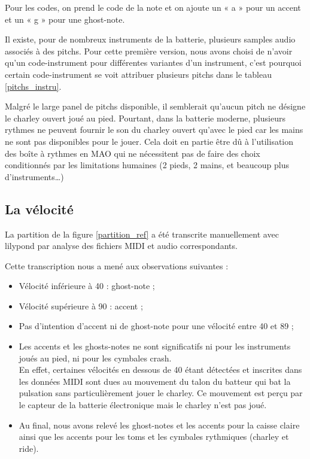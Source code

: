 Pour les codes, 
on prend le code de la note et on ajoute un « a » pour un accent et un « g »
pour une ghost-note.

Il existe, pour de nombreux instruments de la batterie, plusieurs samples audio associés à des pitchs. 
Pour cette première version, nous avons choisi de n’avoir qu’un code-instrument pour différentes variantes d’un instrument, c’est pourquoi certain code-instrument se voit attribuer plusieurs pitchs dans le tableau \ref{pitchs_instru}.

Malgré le large panel de pitchs disponible, il semblerait qu’aucun pitch ne désigne le charley ouvert joué au pied. Pourtant, dans la batterie moderne, plusieurs rythmes ne peuvent fournir le son du charley ouvert qu’avec le pied car les mains ne sont pas disponibles pour le jouer. Cela doit en partie être dû à l’utilisation des boîte à rythmes en MAO qui ne nécessitent pas de faire des choix conditionnés par les limitations humaines (2 pieds, 2 mains, et beaucoup plus d’instruments…)


\subsection*{La vélocité} \label{velocite}
La partition de la figure \ref{partition_ref} a été transcrite manuellement avec lilypond 
par analyse des fichiers MIDI et audio correspondants.

Cette transcription 
nous a mené aux observations suivantes :
\begin{itemize}
	\item Vélocité inférieure à 40 : ghost-note ;
	\item Vélocité supérieure à 90 : accent ;
	\item Pas d’intention d’accent ni de ghost-note pour une vélocité entre 40 et 89 ;
	\item Les accents et les ghosts-notes ne sont significatifs ni pour les instruments joués au pied, ni pour les cymbales crash.\\
	En effet, certaines vélocités en dessous de 40 étant détectées et inscrites dans les données MIDI sont dues au mouvement du talon du batteur qui bat la pulsation sans particulièrement jouer le charley. Ce mouvement est perçu par le capteur de la batterie électronique mais le charley n’est pas joué.
	\item Au final, nous avons relevé les ghost-notes et les accents pour la caisse claire ainsi que les accents pour les toms et les cymbales rythmiques (charley et ride).
\end{itemize}


